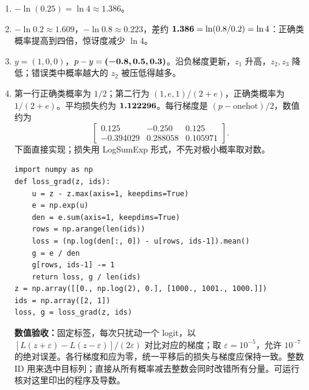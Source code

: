\begin{enumerate}[label={},leftmargin=4.8em,itemsep=4pt]
\item[\textbf{\hyperref[exercise:single-token-cross-entropy]{C-044.}}] \leavevmode{}\label{solution:C-044}\label{solution:single-token-cross-entropy}$-\ln(0.25)=\ln4\approx1.386$。
\item[\textbf{\hyperref[exercise:probability-loss-ratio]{C-045.}}] \leavevmode{}\label{solution:C-045}\label{solution:probability-loss-ratio}$-\ln0.2\approx1.609$，$-\ln0.8\approx0.223$，差约 $\boldsymbol{1.386}=\ln(0.8/0.2)=\ln4$：正确类概率提高到四倍，惊讶度减少 $\ln4$。
\item[\textbf{\hyperref[exercise:softmax-logit-gradient]{C-046.}}] \leavevmode{}\label{solution:C-046}\label{solution:softmax-logit-gradient}$y=(1,0,0)$，$p-y=\boldsymbol{(-0.8,0.5,0.3)}$。沿负梯度更新，$z_1$ 升高，$z_2,z_3$ 降低；错误类中概率越大的 $z_2$ 被压低得越多。
\item[\textbf{\hyperref[exercise:one-hot-gradient-target]{C-047.}}] \leavevmode{}\label{solution:C-047}\label{solution:one-hot-gradient-target}第一行正确类概率为 $1/2$；第二行为 $(1,e,1)/(2+e)$，正确类概率为 $1/(2+e)$。平均损失约为 $\boldsymbol{1.122296}$。每行梯度是 $(p-\mathrm{onehot})/2$，数值约为
\[
\begin{bmatrix}0.125&-0.250&0.125\\-0.394029&0.288058&0.105971\end{bmatrix}.
\]
下面直接实现；损失用 LogSumExp 形式，不先对极小概率取对数。\par\nobreak
\begin{samepage}\begin{verbatim}
import numpy as np
def loss_grad(z, ids):
    u = z - z.max(axis=1, keepdims=True)
    e = np.exp(u)
    den = e.sum(axis=1, keepdims=True)
    rows = np.arange(len(ids))
    loss = (np.log(den[:, 0]) - u[rows, ids-1]).mean()
    g = e / den
    g[rows, ids-1] -= 1
    return loss, g / len(ids)
z = np.array([[0., np.log(2), 0.], [1000., 1001., 1000.]])
ids = np.array([2, 1])
loss, g = loss_grad(z, ids)
\end{verbatim}\end{samepage}
\textbf{数值验收：}固定标签，每次只扰动一个 logit，以 $[L(z+\varepsilon)-L(z-\varepsilon)]/(2\varepsilon)$ 对比对应的梯度；取 $\varepsilon=10^{-5}$，允许 $10^{-7}$ 的绝对误差。各行梯度和应为零，统一平移后的损失与梯度应保持一致。整数 ID 用来选中目标列；直接从所有概率减去整数会同时改错所有分量。可运行  核对这里印出的程序及导数。
\end{enumerate}
